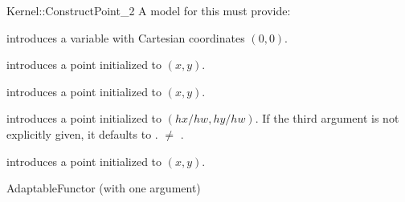 \begin{ccRefFunctionObjectConcept}{Kernel::ConstructPoint_2}
A model for this must provide:


            {introduces a variable  with Cartesian coordinates
              $(0,0)$.}

\ccHidden{}
            {introduces a point  initialized to $(x,y)$.}

\ccHidden{}
            {introduces a point  initialized to $(x,y)$.}

\ccHidden{}
            {introduces a point  initialized to $(hx/hw,hy/hw)$.
             If the third argument is not explicitly given, it defaults
             to .
             \ccPrecond {} $\neq$ . }

\ccHidden{}
            {introduces a point  initialized to $(x,y)$.}

\ccRefines
AdaptableFunctor (with one argument)

\ccSeeAlso
{} \\

\end{ccRefFunctionObjectConcept}
